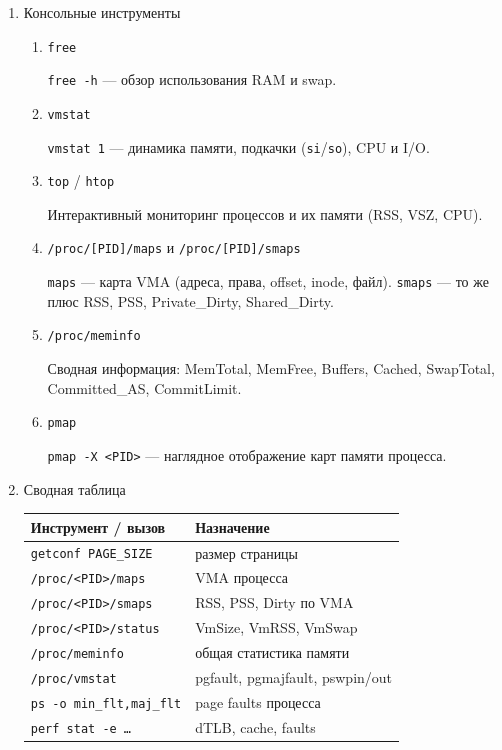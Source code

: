 \begin{enumerate}
\begin{enumerate}
\textbf{Нормальные причины:} demand paging, COW, подключение страницы,
уже находящейся в RAM.
\end{enumerate}


\item Консольные инструменты \label{sec:7}

\begin{enumerate}

\item \texttt{free}

\texttt{free -h} — обзор использования RAM и swap.

\item \texttt{vmstat}

\texttt{vmstat 1} — динамика памяти, подкачки (\texttt{si}/\texttt{so}),
CPU и I/O.

\item \texttt{top} / \texttt{htop}

Интерактивный мониторинг процессов и их памяти (RSS, VSZ, CPU).

\item \texttt{/proc/[PID]/maps} и \texttt{/proc/[PID]/smaps}

\texttt{maps} — карта VMA (адреса, права, offset, inode, файл).
\texttt{smaps} — то же плюс RSS, PSS, Private\_Dirty, Shared\_Dirty.

\item \texttt{/proc/meminfo}

Сводная информация: MemTotal, MemFree, Buffers, Cached, SwapTotal,
Committed\_AS, CommitLimit.

\item \texttt{pmap}

\texttt{pmap -X <PID>} — наглядное отображение карт памяти процесса.

\end{enumerate}

\item Сводная таблица

\begin{center}
\begin{tabular}{|l|l|}
\hline
\textbf{Инструмент / вызов} & \textbf{Назначение} \\
\hline
\texttt{getconf PAGE\_SIZE}    & размер страницы \\
\texttt{/proc/<PID>/maps}      & VMA процесса \\
\texttt{/proc/<PID>/smaps}     & RSS, PSS, Dirty по VMA \\
\texttt{/proc/<PID>/status}    & VmSize, VmRSS, VmSwap \\
\texttt{/proc/meminfo}         & общая статистика памяти \\
\texttt{/proc/vmstat}          & pgfault, pgmajfault, pswpin/out \\
\texttt{ps -o min\_flt,maj\_flt} & page faults процесса \\
\texttt{perf stat -e \ldots}   & dTLB, cache, faults \\
\hline
\end{tabular}
\end{center}
\end{enumerate}